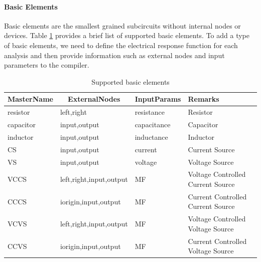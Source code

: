 \paragraph{Basic Elements}
Basic elements are the smallest grained subcircuits without internal nodes or devices. Table \ref{tab:basic-elements-partial-list} provides a brief list of supported basic elements. To add a type of basic elements, we need to define the electrical response function for each analysis and then provide information such as external nodes and input parameters to the compiler.
\begin{table}[htpb]
\centering
\caption{Supported basic elements}
\label{tab:basic-elements-partial-list}
\begin{tabular}{l|l|l|l}
	\hline
	\multicolumn{1}{c}{MasterName}   & \multicolumn{1}{|c|}{ExternalNodes} &
	\multicolumn{1}{c|}{InputParams} & Remarks             \\
	\hline
	resistor   & left,right              & resistance  & Resistor           \\
	capacitor  & input,output            & capacitance & Capacitor           \\
	inductor   & input,output            & inductance  & Inductor           \\
	CS         & input,output            & current     & Current Source           \\
	VS         & input,output            & voltage     & Voltage Source           \\
	VCCS       & left,right,input,output & MF          & Voltage Controlled Current Source   \\
	CCCS       & iorigin,input,output    & MF          & Current Controlled Current Source   \\
	VCVS       & left,right,input,output & MF          & Voltage Controlled Voltage Source   \\
	CCVS       & iorigin,input,output    & MF          & Current Controlled Voltage Source   \\
	\hline
\end{tabular}
\end{table}

